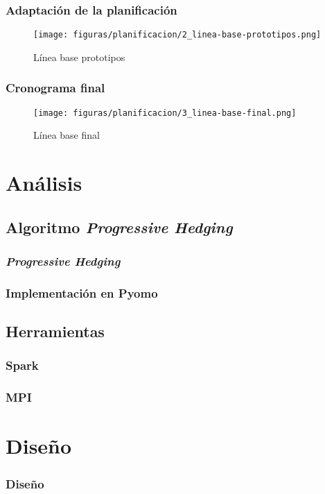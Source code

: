 \documentclass{beamer}
\begin{document}
\begin{frame}[plain]
    \frametitle{Adaptación de la planificación}
    \begin{figure}[H]
        \centerline{\texttt{[image: figuras/planificacion/2\_linea-base-prototipos.png]}}
        \caption{Línea base prototipos}
    \end{figure}
\end{frame}

\begin{frame}[plain]
    \frametitle{Cronograma final}
    \begin{figure}[H]
        \centerline{\texttt{[image: figuras/planificacion/3\_linea-base-final.png]}}
        \caption{Línea base final}
    \end{figure}
\end{frame}

\section{Análisis}

\subsection{Algoritmo \textit{Progressive Hedging}}

\begin{frame}
    \frametitle{\textit{Progressive Hedging}}
\end{frame}

\begin{frame}
    \frametitle{Implementación en Pyomo}
\end{frame}

\subsection{Herramientas}

\begin{frame}
    \frametitle{Spark}
\end{frame}

\begin{frame}{}
    \frametitle{MPI}
\end{frame}

\section{Diseño}

\begin{frame}{}
    \frametitle{Diseño}
\end{frame}
\end{document}
